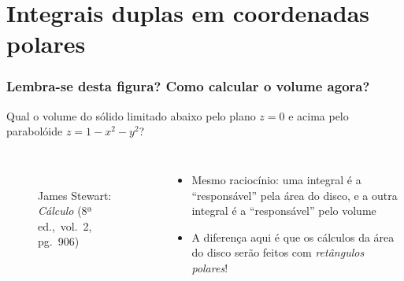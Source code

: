\documentclass[pdftex, brazil, aspectratio=169]{beamer}
\begin{document}
\section{Integrais duplas em coordenadas polares}

\begin{frame}[t]
  \frametitle{Lembra-se desta figura? Como calcular o volume agora?}
  Qual o volume do sólido limitado abaixo pelo plano $z = 0$ 
  e acima pelo parabolóide $z = 1 - x^2 - y^2$?
  \begin{columns}
    \centering
  \begin{figure}[H]
    \begin{center}
      \label{fig:int2-04b}
      \\
      \footnotesize{James Stewart: \emph{Cálculo} (8ª ed.,\ vol.\ 2, pg.\ 906)}
    \end{center}
  \end{figure}
    \centering
    \begin{itemize}
      \item Mesmo raciocínio: uma integral é a ``responsável'' pela
        área do disco, e a outra integral é a ``responsável'' pelo
        volume
        \item A diferença aqui é que 
          os cálculos da área do disco serão
          feitos com \emph{retângulos polares}!
    \end{itemize}
  \end{columns}
\end{frame}
\end{document}
